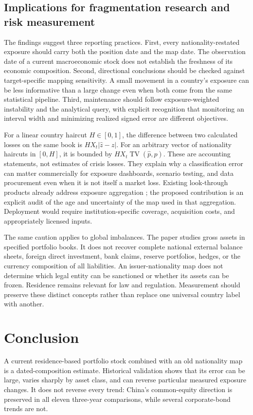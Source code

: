 \documentclass[11pt,a4paper]{article}
\newcommand{\TV}{\operatorname{TV}}
\begin{document}
\subsection{Implications for fragmentation research and risk measurement}
The findings suggest three reporting practices. First, every nationality-restated exposure should carry both the position date and the map date. The observation date of a current macroeconomic stock does not establish the freshness of its economic composition. Second, directional conclusions should be checked against target-specific mapping sensitivity. A small movement in a country's exposure can be less informative than a large change even when both come from the same statistical pipeline. Third, maintenance should follow exposure-weighted instability and the analytical query, with explicit recognition that monitoring an interval width and minimizing realized signed error are different objectives.

For a linear country haircut $H\in[0,1]$, the difference between two calculated losses on the same book is $HX_t|\widehat z-z|$. For an arbitrary vector of nationality haircuts in $[0,H]$, it is bounded by $HX_t\TV(\widehat p,p)$. These are accounting statements, not estimates of crisis losses. They explain why a classification error can matter commercially for exposure dashboards, scenario testing, and data procurement even when it is not itself a market loss. Existing look-through products already address exposure aggregation \citep{crd}; the proposed contribution is an explicit audit of the age and uncertainty of the map used in that aggregation. Deployment would require institution-specific coverage, acquisition costs, and appropriately licensed inputs.

The same caution applies to global imbalances. The paper studies gross assets in specified portfolio books. It does not recover complete national external balance sheets, foreign direct investment, bank claims, reserve portfolios, hedges, or the currency composition of all liabilities. An issuer-nationality map does not determine which legal entity can be sanctioned or whether its assets can be frozen. Residence remains relevant for law and regulation. Measurement should preserve these distinct concepts rather than replace one universal country label with another.

\section{Conclusion}
A current residence-based portfolio stock combined with an old nationality map is a dated-composition estimate. Historical validation shows that its error can be large, varies sharply by asset class, and can reverse particular measured exposure changes. It does not reverse every trend: China's common-equity direction is preserved in all eleven three-year comparisons, while several corporate-bond trends are not.
\end{document}
